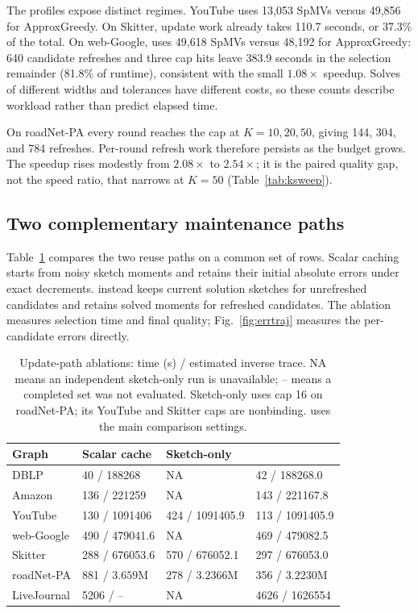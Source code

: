 The profiles expose distinct regimes. YouTube uses 13,053 SpMVs
versus 49,856 for ApproxGreedy. On Skitter, update work already takes
110.7 seconds, or 37.3\% of the total. On web-Google, \alg{} uses
49,618 SpMVs versus 48,192 for ApproxGreedy: 640 candidate refreshes
and three cap hits leave 383.9 seconds in the selection remainder
(81.8\% of runtime), consistent with the small $1.08\times$ speedup.
Solves of different widths and tolerances have different costs, so
these counts describe workload rather than predict elapsed time.

On roadNet-PA every round reaches the cap at $K=10,20,50$, giving
144, 304, and 784 refreshes. Per-round refresh work therefore persists
as the budget grows. The speedup rises modestly from $2.08\times$
to $2.54\times$; it is the paired quality gap, not the speed ratio,
that narrows at $K=50$ (Table~\ref{tab:ksweep}).

\subsection{Two complementary maintenance paths}
Table~\ref{tab:ablation} compares the two reuse paths on a common
set of rows. Scalar caching starts from noisy sketch moments and
retains their initial absolute errors under exact decrements.
\alg{} instead keeps current solution sketches for unrefreshed
candidates and retains solved moments for refreshed candidates.
The ablation measures selection time and final quality;
Fig.~\ref{fig:errtraj} measures the per-candidate errors directly.

\begin{table}[t]
\centering\footnotesize
\caption{Update-path ablations: time (s) / estimated inverse trace.
NA means an independent sketch-only run is unavailable; -- means a
completed set was not evaluated. Sketch-only uses cap 16 on roadNet-PA;
its YouTube and Skitter caps are nonbinding. \alg{} uses the main
comparison settings.}\label{tab:ablation}
\begin{tabular}{@{}llll@{}}\toprule
Graph & Scalar cache & Sketch-only & \alg{}\\\midrule
DBLP & 40 / 188268 & NA & 42 / 188268.0\\
Amazon & 136 / 221259 & NA & 143 / 221167.8\\
YouTube & 130 / 1091406 & 424 / 1091405.9 & 113 / 1091405.9\\
web-Google & 490 / 479041.6 & NA & 469 / 479082.5\\
Skitter & 288 / 676053.6 & 570 / 676052.1 & 297 / 676053.0\\
roadNet-PA & 881 / $3.659\mathrm M$ & 278 / $3.2366\mathrm M$ & 356 / $3.2230\mathrm M$\\
LiveJournal & 5206 / -- & NA & 4626 / 1626554\\
\bottomrule\end{tabular}
\end{table}

